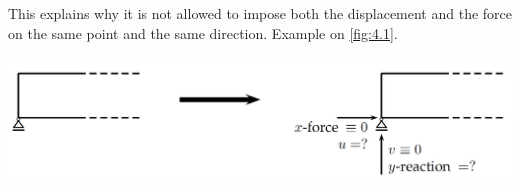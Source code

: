 	This explains why it is not allowed to impose both the displacement and the force on the same point and the same direction. Example on \autoref{fig:4.1}. 
	
	\begin{center}
	\includegraphics[scale=0.3]{ch4/1}
	\label{fig:4.1}
	\end{center}